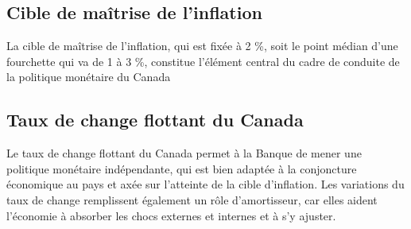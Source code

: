 \documentclass[12pt]{article}
\begin{document}
\subsection{Cible de maîtrise de l’inflation}
La cible de maîtrise de l’inflation, qui est fixée à 2 \%, soit le point médian d’une fourchette qui va de 1 à 3 \%, constitue l’élément central du cadre de conduite de la politique monétaire du Canada
\subsection{Taux de change flottant du Canada}
Le taux de change flottant du Canada permet à la Banque de mener une politique monétaire indépendante, qui est bien adaptée à la conjoncture économique au pays et axée sur l’atteinte de la cible d’inflation. Les variations du taux de change remplissent également un rôle d’amortisseur,  car elles aident l’économie à absorber les chocs externes et internes et à s’y ajuster.
\end{document}
